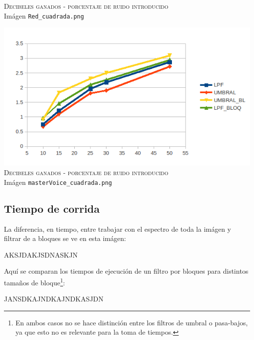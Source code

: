 {\center \textsc{Decibeles ganados - porcentaje de ruido introducido}\\
	Im\'agen \texttt{Red\_cuadrada.png} }


\includegraphics[width=14cm]{voice_psnr.png}
{ \center \textsc{Decibeles ganados - porcentaje de ruido introducido}\\
  \center Im\'agen \texttt{masterVoice\_cuadrada.png} }

\subsection{Tiempo de corrida}

La diferencia, en tiempo, entre trabajar con el espectro de toda la
im\'agen y filtrar de a bloques se ve en esta im\'agen:

AKSJDAKJSDNASKJN

Aqu\'i se comparan los tiempos de ejecuci\'on de un filtro por bloques
para distintos tama\~nos de bloque\footnote{En ambos casos no se hace
distinci\'on entre los filtros de umbral o
pasa-bajos, ya que esto no es relevante para la toma de tiempos.}:

JANSDKAJNDKAJNDKASJDN


